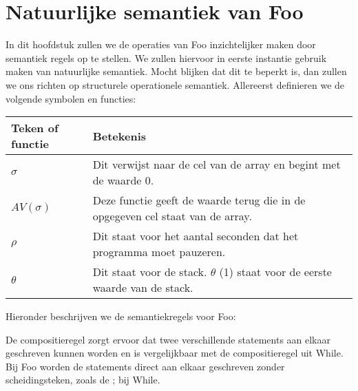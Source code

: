 \documentclass[11pt]{article}
\begin{document}
\section{Natuurlijke semantiek van Foo}
In dit hoofdstuk zullen we de operaties van Foo inzichtelijker maken door semantiek regels op te stellen. 
We zullen hiervoor in eerste instantie gebruik maken van natuurlijke semantiek.
Mocht blijken dat dit te beperkt is, dan zullen we ons richten op structurele operationele semantiek.
Allereerst definieren we de volgende symbolen en functies:
\newline
\newline
\begin{tabular}{ | l | p{12cm} |}
    \hline
    Teken of functie & Betekenis \\ \hline
    \begin{math} \sigma \end{math} &  Dit verwijst naar de cel van de array en begint met de waarde 0. \\ \hline
    \begin{math} AV(\sigma) \end{math} & Deze functie geeft de waarde terug die in de opgegeven cel staat van de array. \\ \hline
    \begin{math} \rho \end{math} &  Dit staat voor het aantal seconden dat het programma moet pauzeren. \\ \hline
    \begin{math} \theta \end{math} &  Dit staat voor de stack. \begin{math}\theta\end{math} (1) staat voor de eerste waarde van de stack. \\ \hline

\end{tabular}
\newline
\newline
\newline
Hieronder beschrijven we de semantiekregels voor Foo:

De compositieregel zorgt ervoor dat twee verschillende statements aan elkaar geschreven kunnen worden en is vergelijkbaar met de compositieregel uit While. 
Bij Foo worden de statements direct aan elkaar geschreven zonder scheidingsteken, zoals de ; bij While.
\end{document}
